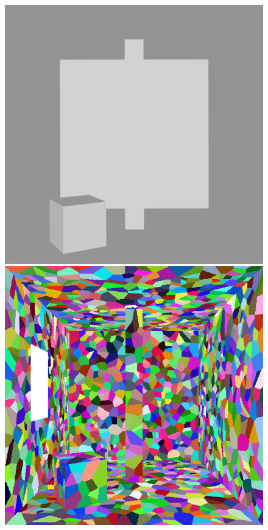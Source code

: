 \documentclass[../dissertation.tex]{subfiles}
\begin{document}
\begin{figure}[!htb]
\centering
{}
\includegraphics[width=1\textwidth]{images/renders/simple_room/geometry.png}
\endminipage\hfill
{}
\includegraphics[width=1\textwidth]{images/renders/simple_room/voronoi.png}

\end{figure}
\end{document}
